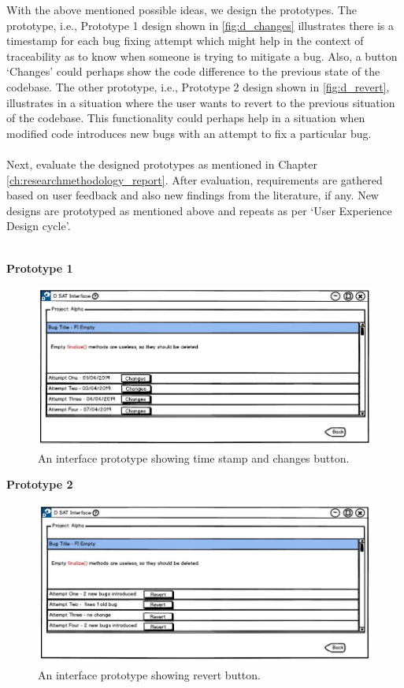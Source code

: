With the above mentioned possible ideas, we design the prototypes. The prototype, i.e., Prototype 1 design shown in \autoref{fig:d_changes} illustrates there is a timestamp for each bug fixing attempt which might help in the context of traceability as to know when someone is trying to mitigate a bug. Also, a button ‘Changes’ could perhaps show the code difference to the previous state of the codebase. The other prototype, i.e., Prototype 2 design shown in \autoref{fig:d_revert}, illustrates in a situation where the user wants to revert to the previous situation of the codebase. This functionality could perhaps help in a situation when modified code introduces new bugs with an attempt to fix a particular bug. \\ \\

Next, evaluate the designed prototypes as mentioned in Chapter \ref{ch:researchmethodology_report}. After evaluation, requirements are gathered based on user feedback and also new findings from the literature, if any. New designs are prototyped as mentioned above and repeats as per ‘User Experience Design cycle’. \\ \\

\clearpage

\textbf{Prototype 1}
\\
\begin{figure}[hbt!]
	\centering
	\includegraphics[width=\linewidth]{figures/d_changes}
	\caption{An interface prototype showing time stamp and changes button.}
	\label{fig:d_changes}
\end{figure}

\textbf{Prototype 2}
\\
\begin{figure}[hbt!]
	\centering
	\includegraphics[width=\linewidth]{figures/d_revert}
	\caption{An interface prototype showing revert button.}
	\label{fig:d_revert}
\end{figure}

\let\cleardoublepage\clearpage


	